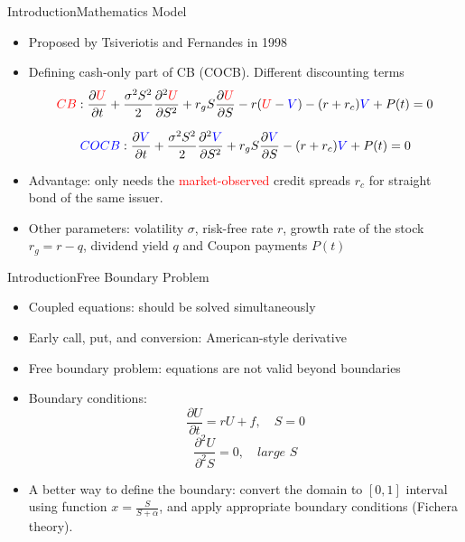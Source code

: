 \documentclass{beamer}
\begin{document}
\begin{frame}[shrink=10] {Introduction}{Mathematics Model}
	\begin{itemize}
		\item Proposed by Tsiveriotis and Fernandes in 1998
		\item Defining cash-only part of CB (COCB). Different discounting terms
\begin{equation*}
\textcolor{red}{CB}: \frac{\partial{\textcolor{red}{U}}}{\partial{t}} + 
\frac{\sigma^2S^2}{2}\frac{\partial^2{\textcolor{red}{U}}}{\partial{S}^2} + r_gS\frac{\partial{\textcolor{red}{U}}}{\partial{S}} - r(\textcolor{red}{U}-\textcolor{blue}{V}) - (r+r_c)\textcolor{blue}{V} + P(t) = 0 
\label{eq:CB}
\end{equation*}

\begin{equation*}
\textcolor{blue}{COCB}: \frac{\partial{\textcolor{blue}{V}}}{\partial{t}} + 
\frac{\sigma^2S^2}{2}\frac{\partial^2{\textcolor{blue}{V}}}{\partial{S}^2} + r_gS\frac{\partial{\textcolor{blue}{V}}}{\partial{S}} - (r+r_c)\textcolor{blue}{V} + P(t) = 0 
\label{eq:COCB}
\end{equation*}
	\item Advantage: only needs the \textcolor{red}{market-observed} credit spreads $r_c$ for straight bond of the same issuer.
	\item Other parameters: volatility $\sigma$, risk-free rate $r$, growth rate of the stock $r_g = r - q$, dividend yield $q$ and Coupon payments $P(t)$  
	\end{itemize}
\end{frame}

\begin{frame} {Introduction}{Free Boundary Problem}
	\begin{itemize}
		\item Coupled equations: should be solved simultaneously
		\item Early call, put, and conversion: American-style derivative
		\item Free boundary problem: equations are not valid beyond boundaries
		\item Boundary conditions:
		\begin{equation*}
		\frac{\partial U}{\partial t} = rU + f, \quad S = 0
		\end{equation*}
		\begin{equation*}
		\frac{\partial^2 U}{\partial^2 S} = 0, \quad \textit{large } S
		\end{equation*}
		\item A better way to define the boundary: convert the domain to $[0, 1]$ interval using function 
		$x = \frac{S}{S+\alpha}$, and apply appropriate boundary conditions (Fichera theory).
	\end{itemize}
\end{frame}
\end{document}
